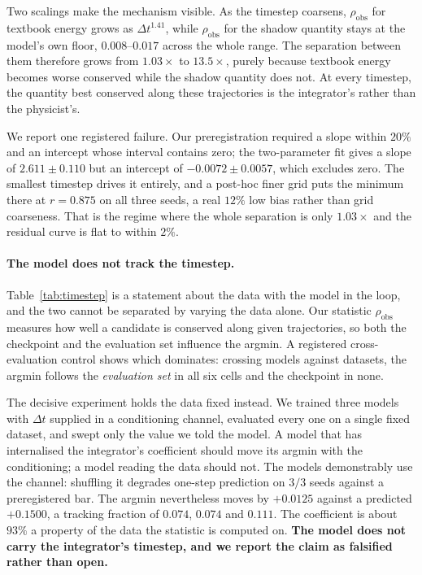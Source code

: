Two scalings make the mechanism visible. As the timestep coarsens, $\rho_{\mathrm{obs}}$ for textbook
energy grows as $\Delta t^{1.41}$, while $\rho_{\mathrm{obs}}$ for the shadow quantity stays at the
model's own floor, $0.008$--$0.017$ across the whole range. The separation between them therefore
grows from $1.03\times$ to $13.5\times$, purely because textbook energy becomes worse conserved while
the shadow quantity does not. At every timestep, the quantity best conserved along these trajectories
is the integrator's rather than the physicist's.

We report one registered failure. Our preregistration required a slope within $20\%$ and an intercept
whose interval contains zero; the two-parameter fit gives a slope of $2.611 \pm 0.110$ but an
intercept of $-0.0072 \pm 0.0057$, which excludes zero. The smallest timestep drives it entirely, and
a post-hoc finer grid puts the minimum there at $r = 0.875$ on all three seeds, a real $12\%$ low
bias rather than grid coarseness. That is the regime where the whole separation is only $1.03\times$
and the residual curve is flat to within $2\%$.

\paragraph{The model does not track the timestep.}
Table~\ref{tab:timestep} is a statement about the data with the model in the loop, and the two cannot
be separated by varying the data alone. Our statistic $\rho_{\mathrm{obs}}$ measures how well a
candidate is conserved along given trajectories, so both the checkpoint and the evaluation set
influence the argmin. A registered cross-evaluation control shows which dominates: crossing models
against datasets, the argmin follows the \emph{evaluation set} in all six cells and the checkpoint in
none.

The decisive experiment holds the data fixed instead. We trained three models with $\Delta t$
supplied in a conditioning channel, evaluated every one on a single fixed dataset, and swept only the
value we told the model. A model that has internalised the integrator's coefficient should move its
argmin with the conditioning; a model reading the data should not. The models demonstrably use the
channel: shuffling it degrades one-step prediction on $3/3$ seeds against a preregistered bar. The
argmin nevertheless moves by $+0.0125$ against a predicted $+0.1500$, a tracking fraction of
$0.074$, $0.074$ and $0.111$. The coefficient is about $93\%$ a property of the data the statistic is
computed on. \textbf{The model does not carry the integrator's timestep, and we report the claim as
falsified rather than open.}

